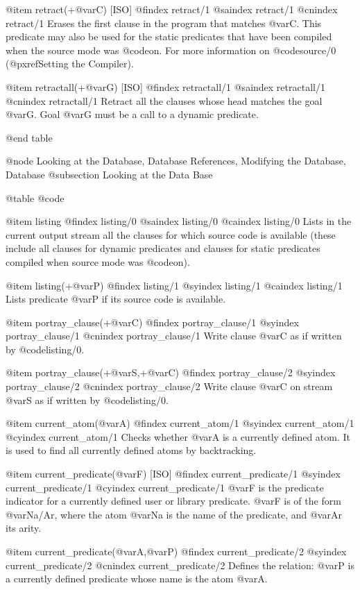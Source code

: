 {{{{{{@item retract(+@var{C}) [ISO]
@findex retract/1
@saindex retract/1
@cnindex retract/1
Erases the first clause in the program that matches @var{C}. This
predicate may also be used for the static predicates that have been
compiled when the source mode was @code{on}. For more information on
@code{source/0} (@pxref{Setting the Compiler}).

@item retractall(+@var{G}) [ISO]
@findex retractall/1
@saindex retractall/1
@cnindex retractall/1
Retract all the clauses whose head matches the goal @var{G}. Goal
@var{G} must be a call to a dynamic predicate.

@end table

@node Looking at the Database, Database References, Modifying the Database, Database
@subsection Looking at the Data Base

@table @code

@item listing
@findex listing/0
@saindex listing/0
@caindex listing/0
Lists in the current output stream all the clauses for which source code
is available (these include all clauses for dynamic predicates and
clauses for static predicates compiled when source mode was @code{on}).

@item listing(+@var{P})
@findex listing/1
@syindex listing/1
@caindex listing/1
Lists predicate @var{P} if its source code is available.

@item portray_clause(+@var{C})
@findex portray_clause/1
@syindex portray_clause/1
@cnindex portray_clause/1
Write clause @var{C} as if written by @code{listing/0}.

@item portray_clause(+@var{S},+@var{C})
@findex portray_clause/2
@syindex portray_clause/2
@cnindex portray_clause/2
Write clause @var{C} on stream @var{S} as if written by @code{listing/0}.

@item current_atom(@var{A})
@findex current_atom/1
@syindex current_atom/1
@cyindex current_atom/1
Checks whether @var{A} is a currently defined atom. It is used to find all
currently defined atoms by backtracking.

@item current_predicate(@var{F}) [ISO]
@findex current_predicate/1
@syindex current_predicate/1
@cyindex current_predicate/1
@var{F} is the predicate indicator for a currently defined user or
library predicate. @var{F} is of the form @var{Na/Ar}, where the atom
@var{Na} is the name of the predicate, and @var{Ar} its arity.

@item current_predicate(@var{A},@var{P})
@findex current_predicate/2
@syindex current_predicate/2
@cnindex current_predicate/2
Defines the relation: @var{P} is a currently defined predicate whose
name is the atom @var{A}.

}}}}}}

